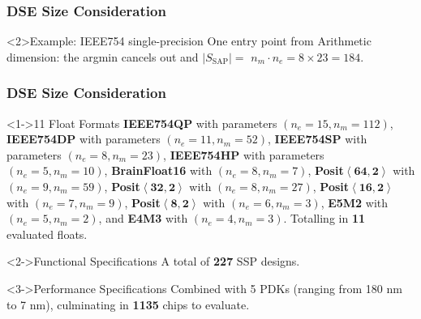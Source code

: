 \begin{frame}
    \frametitle{DSE Size Consideration}
	\begin{alertblock}{Example: IEEE754 single-precision}
        One entry point from Arithmetic dimension: the argmin cancels out and $|S_{\text{SAP}}| =$ \( n_{m} \cdot n_{e} = 8 \times 23 = 184 \).
	\end{alertblock}

\end{frame}
\begin{frame}
    \frametitle{DSE Size Consideration}

	\small
	\begin{block}<1->{11 Float Formats}
		 \textbf{IEEE754QP} with parameters $(n_{e}=15, n_{m}=112)$, \textbf{IEEE754DP} with parameters $(n_{e}=11, n_{m}=52)$, \textbf{IEEE754SP} with parameters $(n_{e}=8, n_{m}=23)$, \textbf{IEEE754HP} with parameters $(n_{e}=5, n_{m}=10)$, \textbf{BrainFloat16} with $(n_{e}=8,n_{m}=7)$, \textbf{Posit}$\mathbf{\left \langle 64,2 \right \rangle}$ with $(n_{e}=9, n_{m}=59)$, \textbf{Posit}$\mathbf{\left \langle 32,2 \right \rangle}$ with $(n_{e}=8, n_{m}=27)$, \textbf{Posit}$\mathbf{\left \langle 16,2 \right \rangle}$ with $(n_{e}=7, n_{m}=9)$, \textbf{Posit}$\mathbf{\left \langle 8,2 \right \rangle}$ with $(n_{e}=6, n_{m}=3)$, \textbf{E5M2} with $(n_{e}=5, n_{m}=2)$, and \textbf{E4M3} with $(n_{e}=4, n_{m}=3)$. Totalling in \textbf{11} evaluated floats.
    \end{block}
        \begin{block}<2->{Functional Specifications}
            A total of \textbf{227} SSP designs.
        \end{block}
        \begin{block}<3->{Performance Specifications}
            Combined with 5 PDKs (ranging from 180 nm to 7 nm), culminating in \textbf{1135} chips to evaluate.
        \end{block}
\normalsize

\end{frame}

